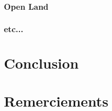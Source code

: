 \documentclass[10pt, conference, compsocconf]{llncs}
\begin{document}
		\subsubsection{Open Land}
		\subsubsection{etc...}

\section{Conclusion}\label{sec:conclusion}

\section*{Remerciements}





\end{document}
